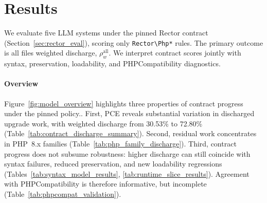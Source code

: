 
\section{Results}
\label{sec:results}

We evaluate five LLM systems under the pinned Rector contract
(Section~\ref{sec:rector_eval}), scoring only \texttt{Rector\textbackslash Php*}
rules. The primary outcome is all files weighted discharge,
$\rho_w^{\mathrm{all}}$. We interpret contract scores jointly with syntax,
preservation, loadability, and PHPCompatibility diagnostics.

\paragraph*{Overview}
Figure~\ref{fig:model_overview} highlights three properties of contract progress under the pinned policy.. First, PCE reveals
substantial variation in discharged upgrade work, with weighted discharge
from 30.53\% to 72.80\%
(Table~\ref{tab:contract_discharge_summary}). Second, residual work
concentrates in PHP~8.x families
(Table~\ref{tab:php_family_discharge}). Third, contract progress does not
subsume robustness: higher discharge can still coincide with syntax
failures, reduced preservation, and new loadability regressions
(Tables~\ref{tab:syntax_model_results},
\ref{tab:runtime_slice_results}). Agreement with PHPCompatibility is
therefore informative, but incomplete
(Table~\ref{tab:phpcompat_validation}).

